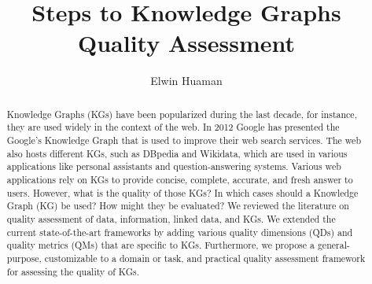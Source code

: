 \documentclass[runningheads]{llncs}
\begin{document}
%
\title{Steps to Knowledge Graphs Quality Assessment}
%
%
\author{Elwin Huaman}
%
%
%
\maketitle              %
%
\begin{abstract}
Knowledge Graphs (KGs) have been popularized during the last decade, for instance, they are used widely in the context of the web. In 2012 Google has presented the Google's Knowledge Graph that is used to improve their web search services. The web also hosts different KGs, such as DBpedia and Wikidata, which are used in various applications like personal assistants and question-answering systems. Various web applications rely on KGs to provide concise, complete, accurate, and fresh answer to users. However, what is the quality of those KGs? In which cases should a Knowledge Graph (KG) be used? How might they be evaluated? We reviewed the literature on quality assessment of data, information, linked data, and KGs. We extended the current state-of-the-art frameworks by adding various quality dimensions (QDs) and quality metrics (QMs) that are specific to KGs. Furthermore, we propose a general-purpose, customizable to a domain or task, and practical quality assessment framework for assessing the quality of KGs.
\end{abstract}
%
\end{document}
